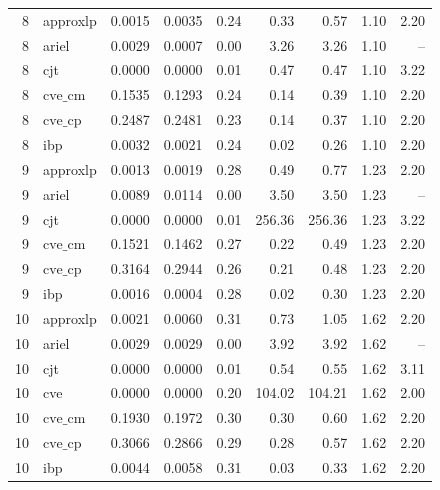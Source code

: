 \documentclass{article}
\begin{document}
\begin{table}[ht]
\begin{tabular}{rlrrrrrrr}
\hline
 8 & approxlp & 0.0015 & 0.0035 & 0.24 & 0.33 & 0.57 & 1.10 & 2.20 \\
 8 & ariel & 0.0029 & 0.0007 & 0.00 & 3.26 & 3.26 & 1.10 & -- \\
 8 & cjt & 0.0000 & 0.0000 & 0.01 & 0.47 & 0.47 & 1.10 & 3.22 \\
 8 & $\text{cve\_cm}$ & 0.1535 & 0.1293 & 0.24 & 0.14 & 0.39 & 1.10 & 2.20 \\
 8 & $\text{cve\_cp}$ & 0.2487 & 0.2481 & 0.23 & 0.14 & 0.37 & 1.10 & 2.20 \\
 8 & ibp & 0.0032 & 0.0021 & 0.24 & 0.02 & 0.26 & 1.10 & 2.20 \\
\hline
 9 & approxlp & 0.0013 & 0.0019 & 0.28 & 0.49 & 0.77 & 1.23 & 2.20 \\
 9 & ariel & 0.0089 & 0.0114 & 0.00 & 3.50 & 3.50 & 1.23 & -- \\
 9 & cjt & 0.0000 & 0.0000 & 0.01 & 256.36 & 256.36 & 1.23 & 3.22 \\
 9 & $\text{cve\_cm}$ & 0.1521 & 0.1462 & 0.27 & 0.22 & 0.49 & 1.23 & 2.20 \\
 9 & $\text{cve\_cp}$ & 0.3164 & 0.2944 & 0.26 & 0.21 & 0.48 & 1.23 & 2.20 \\
 9 & ibp & 0.0016 & 0.0004 & 0.28 & 0.02 & 0.30 & 1.23 & 2.20 \\
\hline
 10 & approxlp & 0.0021 & 0.0060 & 0.31 & 0.73 & 1.05 & 1.62 & 2.20 \\
 10 & ariel & 0.0029 & 0.0029 & 0.00 & 3.92 & 3.92 & 1.62 & -- \\
 10 & cjt & 0.0000 & 0.0000 & 0.01 & 0.54 & 0.55 & 1.62 & 3.11 \\
 10 & cve & 0.0000 & 0.0000 & 0.20 & 104.02 & 104.21 & 1.62 & 2.00 \\
 10 & $\text{cve\_cm}$ & 0.1930 & 0.1972 & 0.30 & 0.30 & 0.60 & 1.62 & 2.20 \\
 10 & $\text{cve\_cp}$ & 0.3066 & 0.2866 & 0.29 & 0.28 & 0.57 & 1.62 & 2.20 \\
 10 & ibp & 0.0044 & 0.0058 & 0.31 & 0.03 & 0.33 & 1.62 & 2.20 \\
\bottomrule
\end{tabular}
\end{table}
\end{document}
